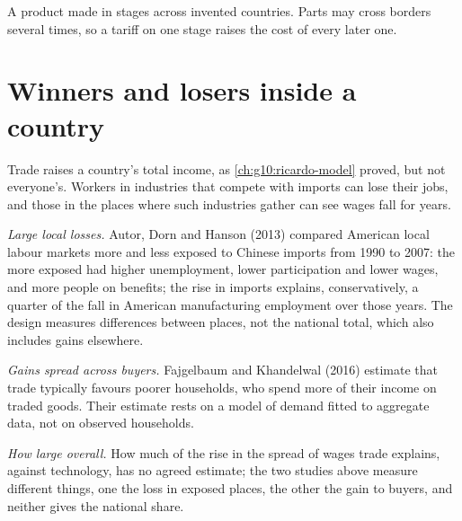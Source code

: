 \begin{omfigure}

{\small A product made in stages across invented countries. Parts may cross borders several times, so a tariff on one stage raises the cost of every later one.}
\end{omfigure}

\section{Winners and losers inside a country}\label{sec:g12:trade-and-trade-policy:losers}

Trade raises a country's total income, as \cref{ch:g10:ricardo-model} proved, but not everyone's. Workers in industries that compete with imports can lose their jobs, and
those in the places where such industries gather can see wages fall for years.

\begin{debate}
\emph{Large local losses.} Autor, Dorn and Hanson (2013) compared American local labour markets more and less exposed to Chinese imports from 1990 to 2007: the more exposed had
higher unemployment, lower participation and lower wages, and more people on benefits; the rise in imports explains, conservatively, a quarter of the fall in American
manufacturing employment over those years. The design measures differences between places, not the national total, which also includes gains elsewhere.

\emph{Gains spread across buyers.} Fajgelbaum and Khandelwal (2016) estimate that trade typically favours poorer households, who spend more of their income on traded goods.
Their estimate rests on a model of demand fitted to aggregate data, not on observed households.

\emph{How large overall.} How much of the rise in the spread of wages trade explains, against technology, has no agreed estimate; the two studies above
measure different things, one the loss in exposed places, the other the gain to buyers, and neither gives the national share.
\end{debate}

